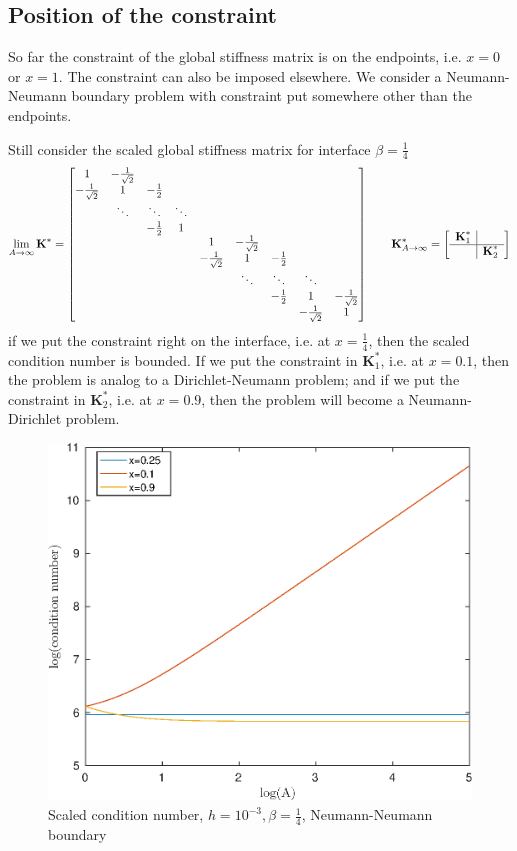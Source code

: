\documentclass[12pt]{article}
\begin{document}
\subsection{Position of the constraint}
So far the constraint of the global stiffness matrix is on the endpoints, i.e. $x=0$ or $x=1$. The constraint can also be imposed elsewhere. We consider a Neumann-Neumann boundary problem with constraint put somewhere other than the endpoints.

Still consider the scaled global stiffness matrix for interface $\beta=\frac{1}{4}$
\[
\lim_{A \to \infty}\textbf{K}^{*}=
\begin{bmatrix}
1 & -\frac{1}{\sqrt{2}} \\
-\frac{1}{\sqrt{2}} & 1 & -\frac{1}{2} \\
& \ddots & \ddots & \ddots \\
&& -\frac{1}{2} & 1 \\
&&& & 1 & -\frac{1}{\sqrt{2}} \\
&&&& -\frac{1}{\sqrt{2}} & 1 & -\frac{1}{2} \\
&&&&& \ddots & \ddots & \ddots \\
&&&&&& -\frac{1}{2} & 1 & -\frac{1}{\sqrt{2}} \\
&&&&&&& -\frac{1}{\sqrt{2}} & 1
\end{bmatrix}
\quad \quad
\textbf{K}^{*}_{A \to \infty}=
\left[
\begin{array}{c|c}
\textbf{K}^{*}_{1} & \\
\hline
& \textbf{K}^{*}_{2}
\end{array}
\right]
\]
if we put the constraint right on the interface, i.e. at $x=\frac{1}{4}$, then the scaled condition number is bounded. If we put the constraint in $\textbf{K}^{*}_{1}$, i.e. at $x=0.1$, then the problem is analog to a Dirichlet-Neumann problem; and if we put the constraint in $\textbf{K}^{*}_{2}$, i.e. at $x=0.9$, then the problem will become a Neumann-Dirichlet problem.

\begin{figure}[h!]
\centering
\includegraphics[scale=0.7]{cond-A-4-NN}
\caption{Scaled condition number, $h=10^{-3},\beta=\frac{1}{4}$, Neumann-Neumann boundary}
\end{figure}
\end{document}
